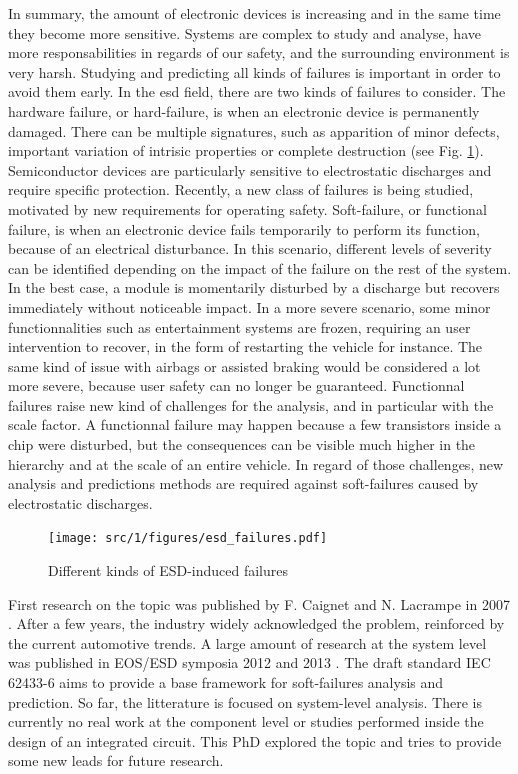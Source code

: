 In summary, the amount of electronic devices is increasing and in the same time they become more sensitive.
Systems are complex to study and analyse, have more responsabilities in regards of our safety, and the surrounding environment is very harsh.
Studying and predicting all kinds of failures is important in order to avoid them early.
In the \gls{esd} field, there are two kinds of failures to consider.
The hardware failure, or hard-failure, is when an electronic device is permanently damaged.
There can be multiple signatures, such as apparition of minor defects, important variation of intrisic properties or complete destruction (see Fig. \ref{fig:esd-failures}).
Semiconductor devices are particularly sensitive to electrostatic discharges \cite{impactESDsemiconductors} and require specific protection.
Recently, a new class of failures is being studied, motivated by new requirements for operating safety.
Soft-failure, or functional failure, is when an electronic device fails temporarily to perform its function, because of an electrical disturbance.
In this scenario, different levels of severity can be identified depending on the impact of the failure on the rest of the system.
In the best case, a module is momentarily disturbed by a discharge but recovers immediately without noticeable impact.
In a more severe scenario, some minor functionnalities such as entertainment systems are frozen, requiring an user intervention to recover, in the form of restarting the vehicle for instance.
The same kind of issue with airbags or assisted braking would be considered a lot more severe, because user safety can no longer be guaranteed.
Functionnal failures raise new kind of challenges for the analysis, and in particular with the scale factor.
A functionnal failure may happen because a few transistors inside a chip were disturbed, but the consequences can be visible much higher in the hierarchy and at the scale of an entire vehicle.
In regard of those challenges, new analysis and predictions methods are required against soft-failures caused by electrostatic discharges.

\begin{figure}[!h]
  \centering
  \texttt{[image: src/1/figures/esd\_failures.pdf]}
  \caption{Different kinds of ESD-induced failures}
  \label{fig:esd-failures}
\end{figure}


First research on the topic was published by F. Caignet and N. Lacrampe in 2007 \cite{}.
After a few years, the industry widely acknowledged the problem, reinforced by the current automotive trends.
A large amount of research at the system level was published in EOS/ESD symposia 2012 \cite{} and 2013 \cite{}.
The draft standard IEC 62433-6 aims to provide a base framework for soft-failures analysis and prediction.
So far, the litterature is focused on system-level analysis.
There is currently no real work at the component level or studies performed inside the design of an integrated circuit.
This PhD explored the topic and tries to provide some new leads for future research.

